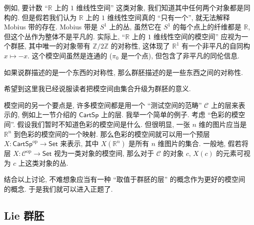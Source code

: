 \documentclass{article}
\theoremstyle{definition}
\newcommand{\CartSp}{\mathsf{CartSp}}
\newcommand{\Set}{\mathsf{Set}}
\newcommand{\op}{\mathrm{op}}
\begin{document}
	例如, 要计数 ``$\mathbb{R}$ 上的 $1$ 维线性空间'' 这类对象, 我们知道其中任何两个对象都是同构的. 但是假若我们认为 $\mathbb{R}$ 上的 $1$ 维线性空间真的 ``只有一个'', 就无法解释 Mobius 带的存在. Mobius 带是 $S^1$ 上的丛, 虽然它在 $S^1$ 的每个点上的纤维都是 $\mathbb{R}$, 但这个丛作为整体不是平凡的.
	实际上, ``$\mathbb{R}$ 上的 $1$ 维线性空间的模空间'' 应视为一个群胚, 其中唯一的对象带有 $\mathbb{Z}/2\mathbb{Z}$ 的对称性, 这体现了 $\mathbb{R}^1$ 有一个非平凡的自同构 $x\mapsto -x$.
	这个模空间虽然是连通的 ($\pi_0$ 是一个点), 但包含了非平凡的同伦信息.
	
	如果说群描述的是一个东西的对称性, 那么群胚描述的是一些东西之间的对称性.
	
	希望到这里我已经说服读者把模空间由集合升级为群胚的意义.
	
	模空间的另一个要点是, 许多模空间都是用一个 ``测试空间的范畴'' $\mathcal C$ 上的层来表示的, 例如上一节介绍的 $\CartSp$ 上的层. 我举一个简单的例子. 考虑 ``色彩的模空间''.
	假设我们暂时不知道色彩的模空间是什么. 但很明显, 一张 $n$ 维的图片应当是 $\mathbb{R}^n$ 到色彩的模空间的一个映射. 那么色彩的模空间就可以用一个预层 $X\colon \CartSp^{\op}\to\Set$ 来表示, 其中
	$X(\mathbb{R}^n)$ 是所有 $n$ 维图片的集合.
	一般地, 假若将层 $X\colon \mathcal C^{\op}\to\Set$ 视为一类对象的模空间, 那么对于 $\mathcal C$ 的对象 $c$, $X(c)$ 的元素可视为 $c$ 上这类对象的丛. %
	
	结合以上讨论, 不难想象应当有一种 ``取值于群胚的层'' 的概念作为更好的模空间的概念. 于是我们就可以进入正题了.
	
	
	\subsection{Lie 群胚}
	
\end{document}
